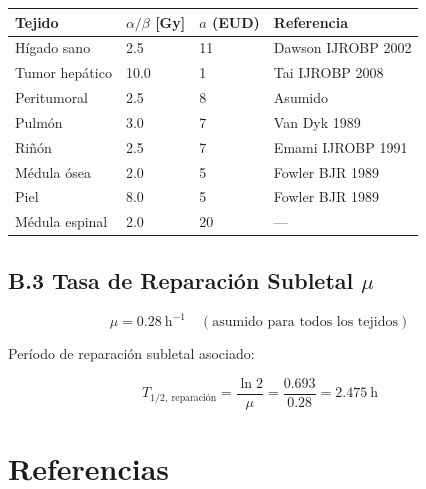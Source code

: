\documentclass[12pt,a4paper]{article}
\begin{document}
\begin{tabular}{p{4cm} p{2.5cm} p{2.5cm} p{4cm}}
\toprule
\textbf{Tejido} & $\alpha/\beta$ [Gy] & $a$ (EUD) & \textbf{Referencia} \\
\midrule
Hígado sano & 2.5 & 11 & Dawson IJROBP 2002 \\
Tumor hepático & 10.0 & 1 & Tai IJROBP 2008 \\
Peritumoral & 2.5 & 8 & Asumido \\
Pulmón & 3.0 & 7 & Van Dyk 1989 \\
Riñón & 2.5 & 7 & Emami IJROBP 1991 \\
Médula ósea & 2.0 & 5 & Fowler BJR 1989 \\
Piel & 8.0 & 5 & Fowler BJR 1989 \\
Médula espinal & 2.0 & 20 & --- \\
\bottomrule
\end{tabular}

\subsection*{B.3 Tasa de Reparación Subletal $\mu$}

$$\mu = 0.28\ \text{h}^{-1} \quad (\text{asumido para todos los tejidos})$$

Período de reparación subletal asociado:

$$T_{1/2,\ \text{reparación}} = \frac{\ln 2}{\mu} = \frac{0.693}{0.28} = 2.475\ \text{h}$$

\newpage

\section*{Referencias}
\end{document}
